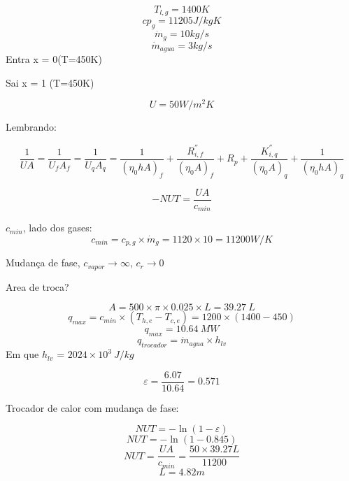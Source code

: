 \[T_{l,g}=1400K\]
\[cp_{g} = 11205 J/kgK\]
\[\dot{m}_{g}=10kg/s\]
\[\dot{m}_{agua}=3 kg/s\]
Entra x = 0(T=450K)

Sai x = 1 (T=450K)

\[U = 50 W/m^{2}K\]

Lembrando:

\[
\frac{1}{UA}=\frac{1}{U_{f}A_{f}}=\frac{1}{U_{q}A_{q}}=\frac{1}{(\eta_{0}hA)_{f}}+\frac{R_{i,f}^{''}}{(\eta_{0}A)_{f}}+ R_{p}+\frac{K_{i,q}^{''}}{(\eta _{0}A)_{q}} + \frac{1}{(\eta_{0}hA)_{q}}
\]

\[- NUT = \frac{UA}{c_{min}}\]

$c_{min}$, lado dos gases:
\[c_{min}=c_{p,g} \times \dot{m}_{g} = 1120 \times 10 = 11200 W/K\]

Mudança de fase, $c_{vapor} \rightarrow \infty$, $c_{r} \rightarrow 0$

Area de troca?

\[A = 500 \times \pi \times 0.025 \times L = 39.27 \ L\]
\[q_{max} = c_{min} \times (T_{h,e}-T_{c,e}) = 1200 \times (1400 - 450)\]
\[q_{max}= 10.64 \ MW\]
\[q_{trocador}=\dot{m}_{agua} \times h_{lv}\]
Em que $h_{lv}$ = $2024 \times 10^{3} \ J/kg$

\[\varepsilon = \frac{6.07}{10.64}=0.571\]

Trocador de calor com mudança de fase:

\[NUT = -\ln(1-\varepsilon)\]
\[NUT = -\ln(1-0.845)\]
\[NUT = \frac{UA}{c_{min}} = \frac{50 \times 39.27L}{ 11200 }\]
\[L = 4.82 m\]